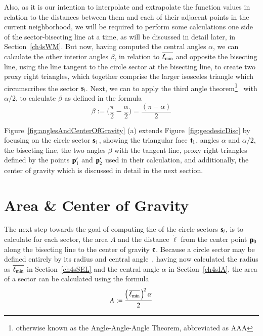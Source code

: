Also, as it is our intention to interpolate and extrapolate the function values in relation to the distances between them and each of their adjacent points in the current neighborhood, we will be required to perform some calculations one side of the sector-bisecting line at a time, as will be discussed in detail later, in Section~\ref{ch4sWM}. But now, having computed the central angles $\alpha$, we can calculate the other interior angles $\beta$, in relation to $\overline{\ell_\text{min}}$ and opposite the bisecting line, using the line tangent to the circle sector at the bisecting line, to create two proxy right triangles, which together comprise the larger isosceles triangle which circumscribes the sector $\mathbf{s}_i$. Next, we can to apply the third angle theorem\footnote{otherwise known as the Angle-Angle-Angle Theorem, abbreviated as AAA}~\cite{Weisstein19f} with $\alpha/2$, to calculate $\beta$ as defined in the formula
%
\begin{equation}
	\beta := \Big(\frac{\pi}{2} - \frac{\alpha}{2}\Big) = \frac{(\pi - \alpha)}{2}
	\label{eq:betaFromHalfAlpha}
\end{equation}%
%
%

Figure~\ref{fig:anglesAndCenterOfGravity} (a) extends Figure~\ref{fig:geodesicDisc} by focusing on the circle sector $\mathbf{s}_1$, showing the triangular face $\mathbf{t}_1$, angles $\alpha$ and $\alpha/2$, the bisecting line, the two angles $\beta$ with the tangent line, proxy right triangles defined by the points $\mathbf{p}'_1$ and $\mathbf{p}'_2$ used in their calculation, and additionally, the center of gravity which is discussed in detail in the next section.

%
%
%
%
\section{Area \& Center of Gravity}
\label{ch4sACG}
The next step towards the goal of computing the  of the circle sectors $\mathbf{s}_i$, is to calculate for each sector, the area $A$ and the distance $\check{\ell}$ from the center point $\mathbf{p}_0$ along the bisecting line to the center of gravity $\mathbf{c}$. Because a circle sector may be defined entirely by its radius and central angle~\cite{Weisstein19d}, having now calculated the radius as $\overline{\ell_\text{min}}$ in Section~\ref{ch4sSEL} and the central angle $\alpha$ in Section~\ref{ch4sIA}, the area of a sector can be calculated using the formula
%
\begin{equation}
	A := \frac{\left (\,\overline{\ell_\text{min}}\,\right )^2\alpha}{2}
	\label{eq:circularSectorArea}
\end{equation}

